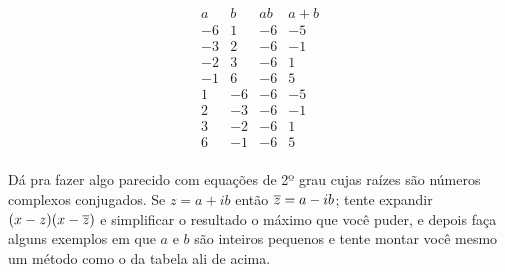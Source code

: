 \documentclass[oneside,12pt]{article}
\begin{document}
{{$$\begin{array}{rrrrr}
  a & b & ab & a+b\!\!\!\!\! \\\hline
  -6 & 1 & -6 & -5 \\
  -3 & 2 & -6 & -1 \\
  -2 & 3 & -6 & 1  \\
  -1 & 6 & -6 & 5  \\
   1 & -6 & -6 & -5  \\
   2 & -3 & -6 & -1  \\
   3 & -2 & -6 & 1  \\
   6 & -1 & -6 & 5  \\
  \end{array}
$$

Dá pra fazer algo parecido com equações de 2º grau cujas raízes são
números complexos conjugados. Se $z=a+ib$ então $\overline z=a-ib$; tente
expandir $(x-z)(x-\overline z)$ e simplificar o resultado o máximo que você
puder, e depois faça alguns exemplos em que $a$ e $b$ são inteiros
pequenos e tente montar você mesmo um método como o da tabela ali de
acima.


}}


\end{document}
